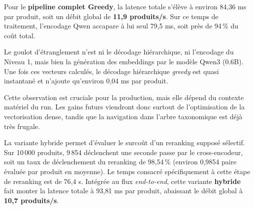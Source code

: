 \documentclass[12pt,a4paper]{report}
\begin{document}
\begin{table}[H]
    \centering
    \caption{Décomposition des coûts du pipeline (10\,000 produits, batch size 64)}
    \label{tab:conclusion-scale-up-details}
\end{table}

Pour le \textbf{pipeline complet Greedy}, la latence totale s'élève à environ 84{,}36 ms par produit, soit un débit global de \textbf{11{,}9 produits/s}. Sur ce temps de traitement, l'encodage Qwen accapare à lui seul 79{,}5 ms, soit près de 94\,\% du coût total.

Le goulot d'étranglement n'est ni le décodage hiérarchique, ni l'encodage du Niveau 1, mais bien la génération des embeddings par le modèle Qwen3 (0.6B). Une fois ces vecteurs calculés, le décodage hiérarchique \textit{greedy} est quasi instantané et n'ajoute qu'environ 0{,}04 ms par produit.

Cette observation est cruciale pour la production, mais elle dépend du contexte matériel du run. Les gains futurs viendront donc surtout de l'optimisation de la vectorisation dense, tandis que la navigation dans l'arbre taxonomique est déjà très frugale.

La variante hybride permet d'évaluer le surcoût d'un reranking supposé sélectif. Sur 10\,000 produits, 9\,854 déclenchent une seconde passe par le cross-encodeur, soit un taux de déclenchement du reranking de 98{,}54\,\% (environ 0{,}9854 paire évaluée par produit en moyenne). Le temps consacré spécifiquement à cette étape de reranking est de 76{,}4 s. Intégrée au flux \textit{end-to-end}, cette variante \textbf{hybride} fait monter la latence totale à 93{,}81 ms par produit, abaissant le débit global à \textbf{10{,}7 produits/s}.
\end{document}
